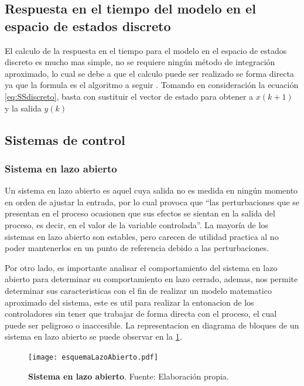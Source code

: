     \subsection{Respuesta en el tiempo del modelo en el espacio de estados discreto}
        
        El calculo de la respuesta en el tiempo para el modelo en el espacio de estados discreto es mucho mas simple, no se requiere ningún método de integración aproximado, lo cual se debe a que el calculo puede ser realizado se forma directa   ya que la formula es el algoritmo a seguir \Parencite{haugen2005discrete}. Tomando en consideración la ecuación \cref{eq:SSdiscreto}, basta con sustituir el vector de estado para obtener a $x(k+1)$ y la salida $y(k)$
    
    \subsection{Sistemas de control}
		
		\subsubsection{Sistema en lazo abierto}
		
            Un sistema en lazo abierto es aquel cuya salida no es medida en ningún momento en orden de ajustar la entrada, por lo cual provoca que \enquote{las perturbaciones que se presentan en el proceso ocasionen que sus efectos se sientan en la salida del proceso, es decir, en el valor de la variable controlada}\Parencite[p.$\,$350]{maloney2006electronica}. La mayoría de los sistemas en lazo abierto son estables, pero carecen de utilidad practica al no poder mantenerlos en un punto de referencia debido a las perturbaciones.
            
            Por otro lado, es importante analisar el comportamiento del sistema en lazo abierto para determinar su comportamiento en lazo cerrado, ademas, nos permite determinar sus caracteristicas con el fin de realizar un modelo matematico aproximado del sistema, este es util para realizar la entonacion de los controladores sin tener que trabajar de forma directa con el proceso, el cual puede ser peligroso o inaccesible. La representacion en diagrama de bloques de un sistema en lazo abierto se puede observar en la \cref{fig:esquemaLazoAbierto}.
            
            \begin{figure}[htb]
				\centering
				\texttt{[image: esquemaLazoAbierto.pdf]}
				\caption[Ejemplo de un sistema en lazo abierto]{\textbf{Sistema en lazo abierto}. Fuente: Elaboración propia.} 
				\label{fig:esquemaLazoAbierto}
            \end{figure}
        
